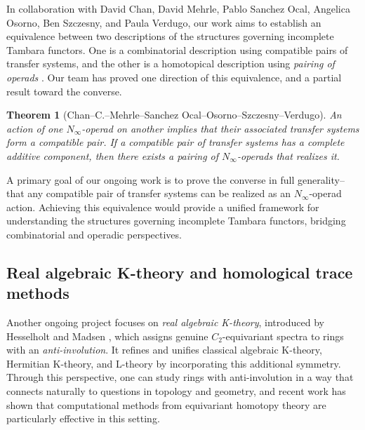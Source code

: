 \documentclass[11pt]{article}
\newtheorem{theorem}{Theorem}
\begin{document}
In collaboration with David Chan, David Mehrle, Pablo Sanchez Ocal, Angelica Osorno, Ben Szczesny, and Paula Verdugo, our work aims to establish an equivalence between two descriptions of the structures governing incomplete Tambara functors. 
One is a combinatorial description using compatible pairs of transfer systems, and the other is a homotopical description using {\it pairing of operads} \cite{MR2544392}. Our team has proved one direction of this equivalence, and a partial result toward the converse.
\begin{theorem}[Chan--C.--Mehrle--Sanchez Ocal--Osorno--Szczesny--Verdugo]
An action of one $N_\infty$-operad on another implies that their associated transfer systems form a compatible pair.
If a compatible pair of transfer systems has a complete additive component, then there exists a pairing of $N_\infty$-operads that realizes it.
\end{theorem}
A primary goal of our ongoing work is to prove the converse in full generality--that any compatible pair of transfer systems can be realized as an $N_\infty$-operad action. Achieving this equivalence would provide a unified framework for understanding the structures governing incomplete Tambara functors, bridging combinatorial and operadic perspectives.




\subsection{Real algebraic K-theory and homological trace methods}
Another ongoing project focuses on {\it real algebraic K-theory}, introduced by Hesselholt and Madsen \cite{HMreal}, which assigns genuine $C_2$-equivariant spectra to rings with an {\it anti-involution}.
It refines and unifies classical algebraic K-theory, Hermitian K-theory, and L-theory by incorporating this additional symmetry.
Through this perspective, one can study rings with anti-involution in a way that connects naturally to questions in topology and geometry, and recent work has shown that computational methods from equivariant homotopy theory are particularly effective in this setting.
\end{document}
